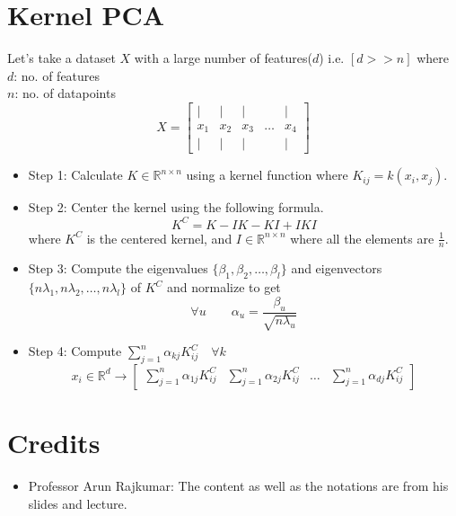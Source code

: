 \documentclass[letterpaper,11pt]{article}
\begin{document}
\newpage
\section{Kernel PCA}
Let's take a dataset $X$ with a large number of features($d$) i.e. $[d >> n]$ where \\ $d$: no. of features \\ $n$: no. of datapoints
$$
X=\left [
\begin{array}{ccccc}
    | & | & | & & | \\
    x_1 & x_2 & x_3 & \ldots & x_4 \\
    | & | & | & & |
\end{array}
\right ]
$$
\begin{itemize}
    \item Step 1: Calculate $K \in \mathbb{R}^{n \times n}$ using a kernel function where $K_{ij}=k(x_i,x_j)$.
    \item Step 2: Center the kernel using the following formula.
    $$
    K^C=K-IK-KI+IKI
    $$
    where $K^C$ is the centered kernel, and $I \in \mathbb{R}^{n \times n}$ where all the elements are $\frac{1}{n}$.
    \item Step 3: Compute the eigenvalues $\{\beta _1, \beta _2, \ldots, \beta _l\}$ and eigenvectors $\{n\lambda _1, n\lambda _2, \ldots, n\lambda _l\}$ of $K^C$ and normalize to get
    $$
    \forall u \hspace{2em} \alpha _u = \frac{\beta _u}{\sqrt{n \lambda _u}}
    $$
    \item Step 4: Compute $\sum _{j=1} ^{n} \alpha _{kj} K^C_{ij} \hspace{1em} \forall k$
    $$
    x_i \in \mathbb{R}^{d} \to 
    \left [
\begin{array}{cccc}
    \sum _{j=1} ^{n} \alpha _{1j} K^C_{ij} & \sum _{j=1} ^{n} \alpha _{2j} K^C_{ij} & \ldots & \sum _{j=1} ^{n} \alpha _{dj} K^C_{ij}
\end{array}
\right ]
    $$
    
\end{itemize}

\section{Credits}
\begin{itemize}
    \item Professor Arun Rajkumar: The content as well as the notations are from his slides and lecture.
\end{itemize}
\end{document}
